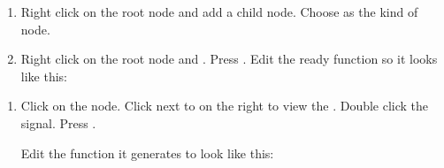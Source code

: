 \documentclass[letterpaper,10pt,english]{sphinxmanual}
\begin{document}
\sphinxAtStartPar
{} 
\begin{enumerate}
%
\setcounter{enumi}{6}
\item {} 
\sphinxAtStartPar
Right click on the root node and add a child node. Choose
 as the kind of node.

\item {} 
\sphinxAtStartPar
Right click on the root node and . Press .
Edit the ready function so it looks like this:

\end{enumerate}

\begin{sphinxVerbatim}[commandchars=\\\{\}]
 
\end{sphinxVerbatim}
\begin{enumerate}
%
\setcounter{enumi}{8}
\item {} 
\sphinxAtStartPar
Click on the  node. Click  next to 
on the right to view the . Double click the
 signal. Press .

\sphinxAtStartPar
Edit the function it generates to look like this:

\end{enumerate}
\end{document}
